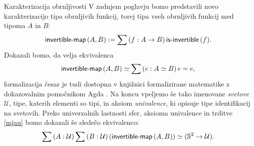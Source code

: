 \documentclass[a4paper, slovene]{article}
\begin{document}
\begin{section}{Karakterizacija obrnljivosti}
  V zadnjem poglavju bomo predstavili novo karakterizacijo tipa obrnljivih funkcij, torej
  tipa vseh obrnljivih funkcij med tipoma \(A\) in \(B\):
  \begin{equation}
    \label{mjau}
      \textnormal{\textsf{invertible-map}}\,(A, B) := \sum \left( f : A \to B \right) \textnormal{\textsf{is-invertible}}\,(f).
  \end{equation}
  Dokazali bomo, da velja ekvivalenca
  \[\textnormal{\textsf{invertible-map}}\,(A, B) \simeq \sum \left( e : A \simeq B \right) e = e,\]
  formalizacija česar je tudi dostopna v knjižnici formalizirane matematike z dokazovalnim
  pomočnikom Agda \cite{agda-unimath}.
  Na koncu vpeljemo še tako imenovane \emph{svetove} \(\mathcal{U}\), tipe, katerih elementi so
  tipi, in aksiom \emph{univalence}, ki opisuje tipe identifikacij na svetovih.
  Preko univerzalnih lastnosti sfer, aksioma univalence in trditve \ref{mjau}
  bomo dokazali še sledečo ekvivalenco:
  \[\sum \left( A : \mathcal{U} \right) \sum \left( B : \mathcal{U} \right) (\textnormal{\textsf{invertible-map}}\,(A, B)) \simeq
    (\mathbb{S}^{2} \to \mathcal{U}).\]
\end{section}
\printbibliography
\end{document}
